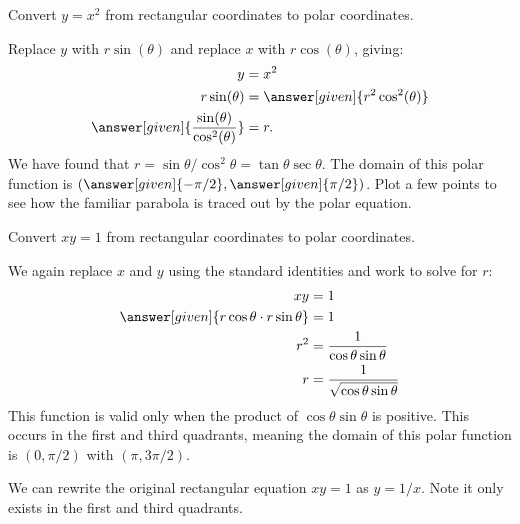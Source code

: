 \documentclass{ximera}
\begin{document}
\begin{example}
  Convert $y=x^2$ from rectangular coordinates to polar coordinates.
  \begin{explanation}
    Replace $y$ with $r\sin(\theta)$ and replace $x$ with $r\cos(\theta)$, giving:
      \begin{align*}
	y &=x^2\\
	r\sin(\theta) &= \answer[given]{r^2\cos^2(\theta)}\\
	\answer[given]{\frac{\sin(\theta)}{\cos^2(\theta)}}  &= r.
      \end{align*}
      We have found that $r=\sin\theta/\cos^2\theta =
      \tan\theta\sec\theta$. The domain of this polar function is
      $\left(\answer[given]{-\pi/2},\answer[given]{\pi/2}\right)$. Plot a few
      points to see how the familiar parabola is traced out by the
      polar equation.
  \end{explanation}
\end{example}

\begin{example}
  Convert $xy = 1$ from rectangular coordinates to polar coordinates.
  \begin{explanation}
    We again replace $x$ and $y$ using the standard identities and
    work to solve for $r$:
    \begin{align*}
	xy &= 1 \\
	\answer[given]{r\cos\theta\cdot r\sin\theta} & = 1\\
	r^2 & = \frac{1}{\cos\theta\sin\theta}\\
	r & = \frac{1}{\sqrt{\cos\theta\sin\theta}}\\
    \end{align*}
    This function is valid only when the product of
    $\cos\theta\sin\theta$ is positive. This occurs in the first and
    third quadrants, meaning the domain of this polar function is
    $(0,\pi/2)$ with $(\pi,3\pi/2)$.
      
    We can rewrite the original rectangular equation $xy=1$ as
    $y=1/x$. Note it only exists in the first and third quadrants.
  \end{explanation}
\end{example}
\end{document}
